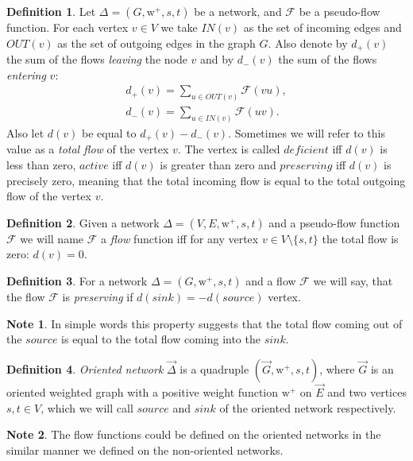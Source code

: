 \documentclass[12pt]{article}
\theoremstyle{definition}
\newtheorem*{note}{Note}
\newtheorem{definition}{Definition}
\newcommand{\wtp}{\mathrm{w}^{+}}
\newcommand{\flow}{\mathcal{F}}
\newcommand{\source}{\mathit{source}}
\newcommand{\sink}{\mathit{sink}}
\newcommand{\net}{\Delta}
\newcommand{\onet}{\vec{\Delta}}
\numberwithin{remark}{section}
\numberwithin{theorem}{section}
\numberwithin{prop}{section}
\numberwithin{equation}{section}
\numberwithin{lemma}{section}
\numberwithin{prop_under_lemma}{lemma}
\begin{document}
    \begin{definition}
      Let $\net = (G, \wtp, s, t)$ be a network, and $\flow$ be a pseudo-flow function.
      For each vertex $v \in V$ we take $IN(v)$ as the set of incoming edges
      and $OUT(v)$ as the set of outgoing edges in the graph $G$.
      Also denote by $d_{+}(v)$ the sum of the flows \emph{leaving} the node $v$ and by
      $d_{-}(v)$ the sum of the flows \emph{entering} $v$:
      \begin{align*}
          d_{+}(v) = \sum_{u \in OUT(v)} \flow(vu),\\
          d_{-}(v) = \sum_{u \in IN(v)} \flow(uv).
      \end{align*}
      Also let $d(v)$ be equal to $d_{+}(v) - d_{-}(v)$. Sometimes we will refer to this value as
      a \emph{total flow} of the vertex $v$.
      The vertex is called $deficient$ iff $d(v)$ is less than zero,
      $active$ iff $d(v)$ is greater than zero and
      $preserving$ iff $d(v)$ is precisely zero, meaning that the total incoming flow
      is equal to the total outgoing flow of the vertex $v$.
    \end{definition}
    \begin{definition}
      Given a network $\net = (V, E, \wtp, s, t)$ and a pseudo-flow function $\flow$ we will name $\flow$ a
        \emph{flow} function iff for any vertex $v \in V \setminus \{s,t\}$ the total flow is zero: $d(v) = 0$.
    \end{definition}
    \begin{definition}
      For a network $\net = (G, \wtp, s, t)$ and a flow $\flow$ we will say,
      that the flow $\flow$ is \emph{preserving} if $d(\sink) = -d(\source)$ vertex.
    \end{definition}
    \begin{note}
      In simple words this property suggests
        that the total flow coming out of the $\source$ is equal to the total flow
        coming into the $\sink$.
    \end{note}
    \begin{definition}
      \emph{Oriented network} $\onet$ is a quadruple $(\vec{G}, \wtp, s, t)$, where
        $\vec{G}$ is an oriented weighted graph with 
        a positive weight function $\wtp$ on $\vec{E}$ and two vertices $s, t \in V$, which
        we will call $\source$ and $\sink$ of the oriented network respectively.
    \end{definition}
    \begin{note}
      The flow functions could be defined on the oriented networks in the similar manner
      we defined on the non-oriented networks.
    \end{note}
\end{document}
